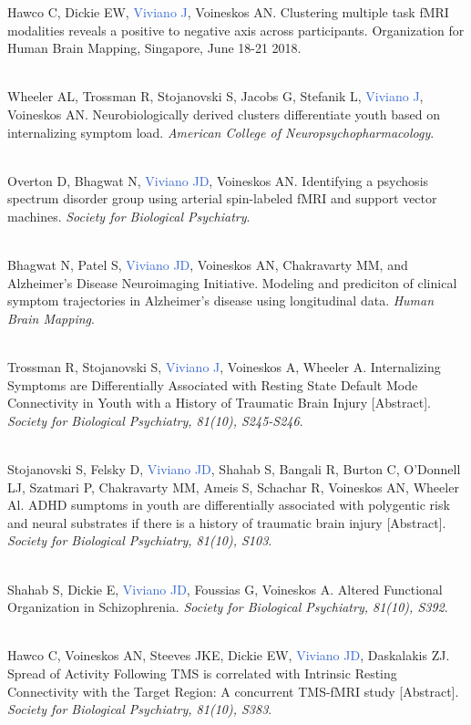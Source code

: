 \documentclass[a4paper,11pt,oneside]{book}
\begin{document}
\begin{flushleft}
Hawco C, Dickie EW, \textcolor{highlight}{Viviano J}, Voineskos AN. Clustering multiple task fMRI modalities reveals a positive to negative axis across participants. Organization for Human Brain Mapping, Singapore, June 18-21 2018. \\\

Wheeler AL, Trossman R, Stojanovski S, Jacobs G, Stefanik L, \textcolor{highlight}{Viviano J}, Voineskos AN. Neurobiologically derived clusters differentiate youth based on internalizing symptom load. \textit{American College of Neuropsychopharmacology}. \\\

Overton D, Bhagwat N, \textcolor{highlight}{Viviano JD}, Voineskos AN. Identifying a psychosis spectrum disorder group using arterial spin-labeled fMRI and support vector machines. \textit{Society for Biological Psychiatry}. \\\

Bhagwat N, Patel S, \textcolor{highlight}{Viviano JD}, Voineskos AN, Chakravarty MM, and Alzheimer's Disease Neuroimaging Initiative. Modeling and prediciton of clinical symptom trajectories in Alzheimer's disease using longitudinal data. \textit{Human Brain Mapping}. \\\

Trossman R, Stojanovski S, \textcolor{highlight}{Viviano J}, Voineskos A, Wheeler A. Internalizing Symptoms are Differentially Associated with Resting State Default Mode Connectivity in Youth with a History of Traumatic Brain Injury [Abstract]. \textit{Society for Biological Psychiatry, 81(10), S245-S246}. \\\

Stojanovski S, Felsky D, \textcolor{highlight}{Viviano JD}, Shahab S, Bangali R, Burton C, O'Donnell LJ, Szatmari P, Chakravarty MM, Ameis S, Schachar R, Voineskos AN, Wheeler Al. ADHD sumptoms in youth are differentially associated with polygentic risk and neural substrates if there is a history of traumatic brain injury [Abstract]. \textit{Society for Biological Psychiatry, 81(10), S103}. \\\

Shahab S, Dickie E, \textcolor{highlight}{Viviano JD}, Foussias G, Voineskos A. Altered Functional Organization in Schizophrenia. \textit{Society for Biological Psychiatry, 81(10), S392}. \\\

Hawco C, Voineskos AN, Steeves JKE, Dickie EW, \textcolor{highlight}{Viviano JD}, Daskalakis ZJ. Spread of Activity Following TMS is correlated with Intrinsic Resting Connectivity with the Target Region: A concurrent TMS-fMRI study [Abstract]. \textit{Society for Biological Psychiatry, 81(10), S383}. \\\


\end{flushleft}
\end{document}
